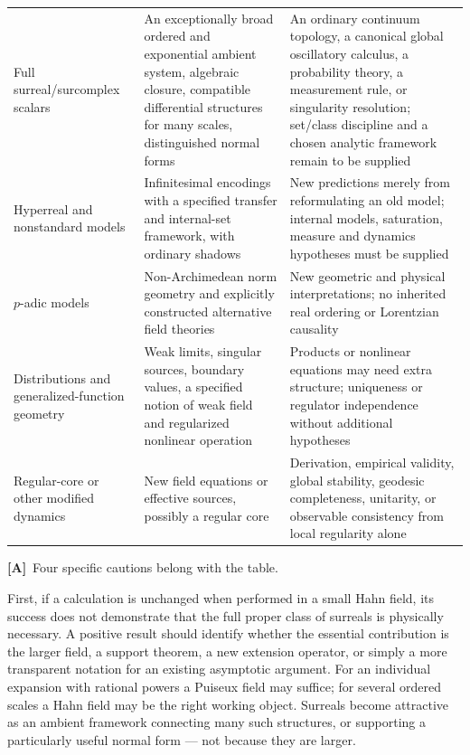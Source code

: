 \documentclass[11pt,letterpaper]{article}
\numberwithin{equation}{section}
\theoremstyle{definition}
\theoremstyle{remark}
\newcommand{\TA}{\textcolor{TierA}{\textsf{\bfseries[A]}}}
\begin{document}
\begin{longtable}{@{}L{0.19\textwidth}L{0.36\textwidth}L{0.38\textwidth}@{}}
\addlinespace
Full surreal/surcomplex scalars &
An exceptionally broad ordered and exponential ambient system, algebraic
closure, compatible differential structures for many scales, distinguished
normal forms &
An ordinary continuum topology, a canonical global oscillatory calculus, a
probability theory, a measurement rule, or singularity resolution;
set/class discipline and a chosen analytic framework remain to be supplied \\
\addlinespace
Hyperreal and nonstandard models &
Infinitesimal encodings with a specified transfer and internal-set framework,
with ordinary shadows &
New predictions merely from reformulating an old model; internal models,
saturation, measure and dynamics hypotheses must be supplied \\
\addlinespace
$p$-adic models &
Non-Archimedean norm geometry and explicitly constructed alternative field
theories &
New geometric and physical interpretations; no inherited real ordering or
Lorentzian causality \\
\addlinespace
Distributions and generalized-function geometry &
Weak limits, singular sources, boundary values, a specified notion of weak
field and regularized nonlinear operation &
Products or nonlinear equations may need extra structure; uniqueness or
regulator independence without additional hypotheses \\
\addlinespace
Regular-core or other modified dynamics &
New field equations or effective sources, possibly a regular core &
Derivation, empirical validity, global stability, geodesic completeness,
unitarity, or observable consistency from local regularity alone \\
\end{longtable}

\TA\ Four specific cautions belong with the table.

First, if a calculation is unchanged when performed in a small Hahn field, its
success does not demonstrate that the full proper class of surreals is
physically necessary. A positive result should identify whether the essential
contribution is the larger field, a support theorem, a new extension operator,
or simply a more transparent notation for an existing asymptotic argument. For
an individual expansion with rational powers a Puiseux field may suffice; for
several ordered scales a Hahn field may be the right working object. Surreals
become attractive as an ambient framework connecting many such structures, or
supporting a particularly useful normal form --- not because they are larger.
\end{document}

